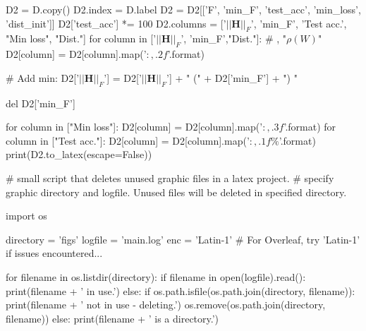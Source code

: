 D2 = D.copy()
D2.index = D.label
D2 = D2[['F', 'min_F', 'test_acc', 'min_loss', 'dist_init']]
D2['test_acc'] *= 100
D2.columns = ['$||\mathbf{H}||_F$', 'min_F', 'Test acc.', "Min loss", "Dist."]
for column in ['$||\mathbf{H}||_F$', 'min_F',"Dist."]: # , "$\rho(W)$"
    D2[column] = D2[column].map('${:,.2f}$'.format)
    
    
# Add min:
D2['$||\mathbf{H}||_F$'] = D2['$||\mathbf{H}||_F$'] + " (" + D2['min_F'] + ") "

del D2['min_F']
    
for column in ["Min loss"]:
    D2[column] = D2[column].map('${:,.3f}$'.format)
for column in ["Test acc."]:
    D2[column] = D2[column].map('${:,.1f}\%$'.format)
print(D2.to_latex(escape=False))


# small script that deletes unused graphic files in a latex project.
# specify graphic directory and logfile. Unused files will be deleted in specified directory.

import os

directory = 'figs'
logfile = 'main.log'
enc = 'Latin-1' # For Overleaf, try 'Latin-1' if issues encountered...

for filename in os.listdir(directory):
    if filename in open(logfile).read():
        print(filename + ' in use.')
    else:
        if os.path.isfile(os.path.join(directory, filename)):
            print(filename + ' not in use - deleting.')
            os.remove(os.path.join(directory, filename))
        else:
            print(filename + ' is a directory.')